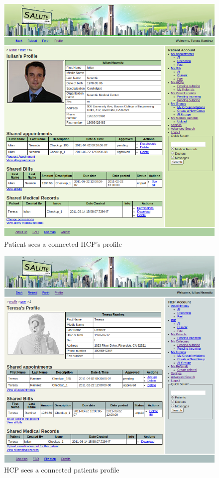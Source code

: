 \begin{figure}
\includegraphics[scale=0.5]{screenshots/patient_sees_hcp_profile.png}
\caption{Patient sees a connected HCP's profile}
\end{figure}

\begin{figure}
\includegraphics[scale=0.5]{screenshots/hcp_sees_patient_profile.png}
\caption{HCP sees a connected patients profile}
\end{figure}

